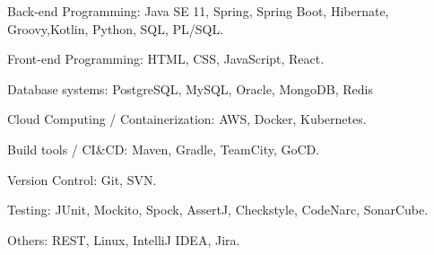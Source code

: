 

\begin{cvskills}


  \cvskill
    {Back-end Programming:} %
    {Java SE 11, Spring, Spring Boot, Hibernate, Groovy,Kotlin, Python, SQL, PL/SQL.} %

  \cvskill
    {Front-end Programming:} %
    {HTML, CSS, JavaScript, React.} %

  \cvskill
    {Database systems:} %
    {PostgreSQL, MySQL, Oracle, MongoDB, Redis} %

  \cvskill
    {Cloud Computing / Containerization:} %
    {AWS, Docker, Kubernetes.} %

  \cvskill
    {Build tools / CI\&CD:} %
    {Maven, Gradle, TeamCity, GoCD.} %

  \cvskill
    {Version Control:} %
    {Git, SVN.} %

  \cvskill
    {Testing:} %
    {JUnit, Mockito, Spock, AssertJ, Checkstyle, CodeNarc, SonarCube.} %
    
  \cvskill
    {Others:} %
    {REST, Linux, IntelliJ IDEA, Jira.} %



\end{cvskills}
